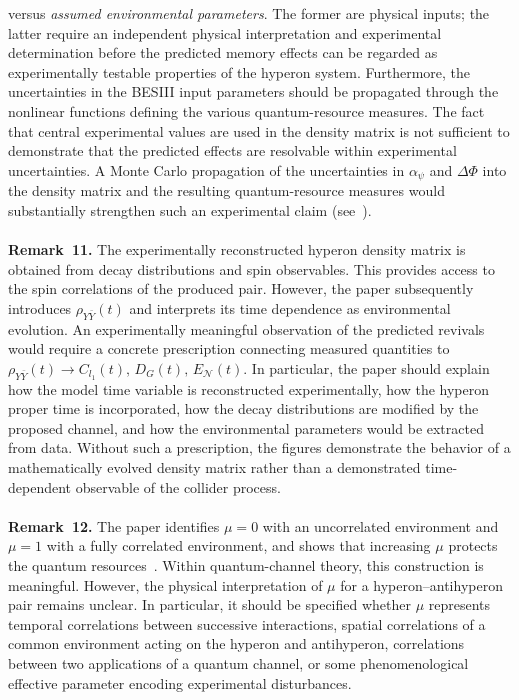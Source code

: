 \documentclass[epjc,twocolumn,nofootinbib,preprintnumbers,amsmath,amssymb]{revtex4-2}
\begin{document}
versus
\textit{assumed environmental parameters}.
The former are physical inputs; the latter require an independent physical interpretation and experimental determination before the predicted memory effects can be regarded as experimentally testable properties of the hyperon system.
Furthermore, the uncertainties in the BESIII input parameters should be propagated through the nonlinear functions defining the various quantum-resource measures. The fact that central experimental values are used in the density matrix is not sufficient to demonstrate that the predicted effects are resolvable within experimental uncertainties.
A Monte Carlo propagation of the uncertainties in $\alpha_\psi$ and $\Delta\Phi$ into the density matrix and the resulting quantum-resource measures would substantially strengthen such an experimental claim (see~\cite{haddadiprb2026}).
\\
\\
\textbf{Remark~11.}
The experimentally reconstructed hyperon density matrix is obtained from decay distributions and spin observables. This provides access to the spin correlations of the produced pair.
However, the paper subsequently introduces
$
\rho_{Y\bar Y}(t)
$
and interprets its time dependence as environmental evolution.
An experimentally meaningful observation of the predicted revivals would require a concrete prescription connecting measured quantities to
$
\rho_{Y\bar Y}(t)
\rightarrow
C_{l_1}(t),\,
D_G(t),\,
E_{\mathcal N}(t).
$
In particular, the paper should explain how the model time variable is reconstructed experimentally, how the hyperon proper time is incorporated, how the decay distributions are modified by the proposed channel, and how the environmental parameters would be extracted from data.
Without such a prescription, the figures demonstrate the behavior of a mathematically evolved density matrix rather than a demonstrated time-dependent observable of the collider process.
\\
\\
\textbf{Remark~12.}
The paper identifies $\mu=0$ with an uncorrelated environment and $\mu=1$ with a fully correlated environment, and shows that increasing $\mu$ protects the quantum resources~\cite{Bachain}.
Within quantum-channel theory, this construction is meaningful. However, the physical interpretation of $\mu$ for a hyperon--antihyperon pair remains unclear.
In particular, it should be specified whether $\mu$ represents temporal correlations between successive interactions, spatial correlations of a common environment acting on the hyperon and antihyperon, correlations between two applications of a quantum channel, or some phenomenological effective parameter encoding experimental disturbances.
\end{document}
